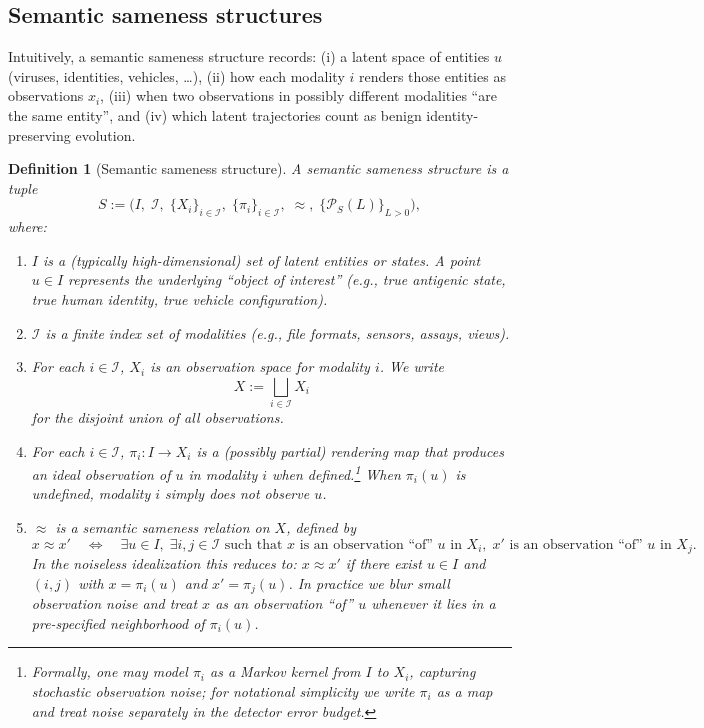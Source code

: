 \documentclass[11pt]{article}
\newtheorem{definition}{Definition}
\begin{document}
\subsection{Semantic sameness structures}
\label{subsec:semantic-structure}

Intuitively, a semantic sameness structure records:
(i) a latent space of entities $u$ (viruses, identities, vehicles, \dots),
(ii) how each modality $i$ renders those entities as observations $x_i$,
(iii) when two observations in possibly different modalities ``are the same entity'', and
(iv) which latent trajectories count as benign identity-preserving evolution.

\begin{definition}[Semantic sameness structure]\label{def:sameness-structure}
\label{def:semantic-structure}
A \emph{semantic sameness structure} is a tuple
\[
S := \bigl( I,\; \mathcal{I},\; \{X_i\}_{i\in\mathcal{I}},\; \{\pi_i\}_{i\in\mathcal{I}},\; \approx,\;
\{\mathcal{P}_S(L)\}_{L>0} \bigr),
\]
where:
\begin{enumerate}[label=\textnormal{(\roman*)}, leftmargin=*]
\item $I$ is a (typically high-dimensional) set of \emph{latent entities} or states. A point
$u\in I$ represents the underlying ``object of interest'' (e.g., true antigenic state, true
human identity, true vehicle configuration).

\item $\mathcal{I}$ is a finite index set of \emph{modalities} (e.g., file formats, sensors,
assays, views).

\item For each $i\in\mathcal{I}$, $X_i$ is an \emph{observation space} for modality $i$.
We write
\[
X := \bigsqcup_{i\in\mathcal{I}} X_i
\]
for the disjoint union of all observations.

\item For each $i\in\mathcal{I}$, $\pi_i : I \to X_i$ is a (possibly partial) \emph{rendering
map} that produces an ideal observation of $u$ in modality $i$ when defined.\footnote{%
Formally, one may model $\pi_i$ as a Markov kernel from $I$ to $X_i$, capturing stochastic
observation noise; for notational simplicity we write $\pi_i$ as a map and treat noise
separately in the detector error budget.}
When $\pi_i(u)$ is undefined, modality $i$ simply does not observe $u$.

\item $\approx$ is a \emph{semantic sameness relation} on $X$, defined by
\[
x \approx x'
\quad\Longleftrightarrow\quad
\exists u\in I,\; \exists i,j\in\mathcal{I} \text{ such that }
x \text{ is an observation ``of'' } u \text{ in } X_i,\;
x' \text{ is an observation ``of'' } u \text{ in } X_j.
\]
In the noiseless idealization this reduces to:
$x\approx x'$ if there exist $u\in I$ and $(i,j)$ with $x=\pi_i(u)$ and $x'=\pi_j(u)$.
In practice we blur small observation noise and treat $x$ as an observation ``of'' $u$
whenever it lies in a pre-specified neighborhood of $\pi_i(u)$.


\end{enumerate}
\end{definition}
\end{document}
